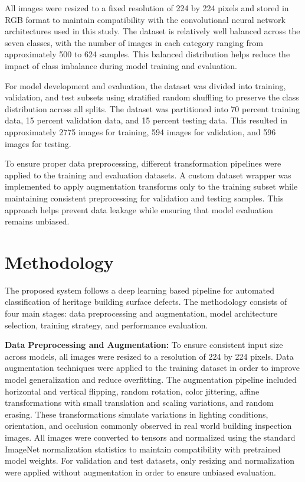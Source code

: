 \documentclass[conference]{IEEEtran}
\begin{document}
All images were resized to a fixed resolution of 224 by 224 pixels and stored in RGB format to maintain compatibility with the convolutional neural network architectures used in this study. The dataset is relatively well balanced across the seven classes, with the number of images in each category ranging from approximately 500 to 624 samples. This balanced distribution helps reduce the impact of class imbalance during model training and evaluation.

For model development and evaluation, the dataset was divided into training, validation, and test subsets using stratified random shuffling to preserve the class distribution across all splits. The dataset was partitioned into 70 percent training data, 15 percent validation data, and 15 percent testing data. This resulted in approximately 2775 images for training, 594 images for validation, and 596 images for testing.

To ensure proper data preprocessing, different transformation pipelines were applied to the training and evaluation datasets. A custom dataset wrapper was implemented to apply augmentation transforms only to the training subset while maintaining consistent preprocessing for validation and testing samples. This approach helps prevent data leakage while ensuring that model evaluation remains unbiased.


\section{Methodology}
The proposed system follows a deep learning based pipeline for automated classification of heritage building surface defects. The methodology consists of four main stages: data preprocessing and augmentation, model architecture selection, training strategy, and performance evaluation.

\textbf{Data Preprocessing and Augmentation:}
To ensure consistent input size across models, all images were resized to a resolution of 224 by 224 pixels. Data augmentation techniques were applied to the training dataset in order to improve model generalization and reduce overfitting. The augmentation pipeline included horizontal and vertical flipping, random rotation, color jittering, affine transformations with small translation and scaling variations, and random erasing. These transformations simulate variations in lighting conditions, orientation, and occlusion commonly observed in real world building inspection images. All images were converted to tensors and normalized using the standard ImageNet normalization statistics to maintain compatibility with pretrained model weights. For validation and test datasets, only resizing and normalization were applied without augmentation in order to ensure unbiased evaluation.
\end{document}

